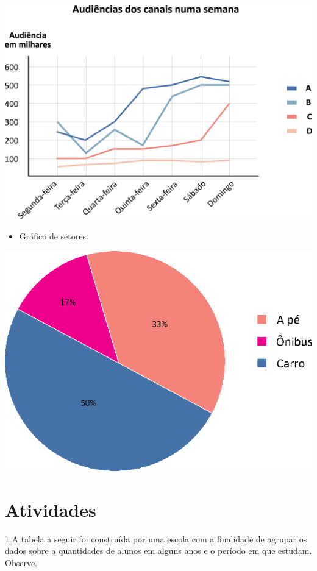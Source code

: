 {\includegraphics[width=\textwidth]{media/image40.png}

\pagebreak
\begin{itemize}
\item
  Gráfico de setores.
\end{itemize}

\includegraphics[width=\textwidth]{media/image41.png}
}

\section*{Atividades}

\num{1} A tabela a seguir foi construída por uma escola com a finalidade de agrupar os
dados sobre a quantidades de alunos em alguns anos e o período em que
estudam. Observe.

